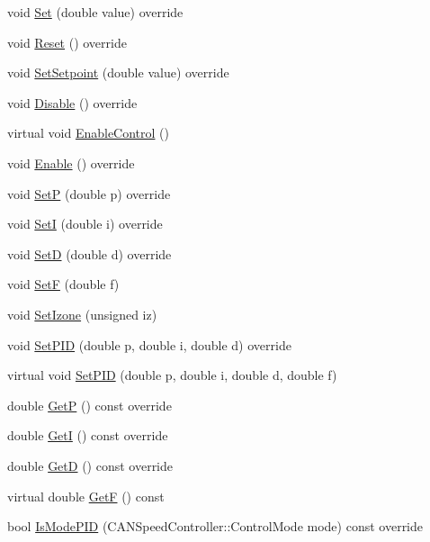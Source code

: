 \begin{DoxyCompactItemize}
\item 
void \hyperlink{class_c_a_n_talon_a4562f7fb454693a0b19e6eba955a0c71}{Set} (double value) override
\item 
void \hyperlink{class_c_a_n_talon_acb83bdcca65d305472d1f7c23ae6d2ee}{Reset} () override
\item 
void \hyperlink{class_c_a_n_talon_abad2c78d5a46552d7e0eac171214083d}{Set\+Setpoint} (double value) override
\item 
void \hyperlink{class_c_a_n_talon_a8bd799926d0efa4e4cf99d0f64e94371}{Disable} () override
\item 
virtual void \hyperlink{class_c_a_n_talon_a174cae574f8c73a4d211d7484fddd7ef}{Enable\+Control} ()
\item 
void \hyperlink{class_c_a_n_talon_a564c64c730580b6f80cf6c5f9eb42032}{Enable} () override
\item 
void \hyperlink{class_c_a_n_talon_a6a8c44252d104634d6a0c580088cbf98}{SetP} (double p) override
\item 
void \hyperlink{class_c_a_n_talon_ac72349fb7837dff1a27c5288416eb1ac}{SetI} (double i) override
\item 
void \hyperlink{class_c_a_n_talon_ad1d9dc5cb06e4efbf57ed10d91f2ee80}{SetD} (double d) override
\item 
void \hyperlink{class_c_a_n_talon_ac147cdb9096848beac85a25d04489d60}{SetF} (double f)
\item 
void \hyperlink{class_c_a_n_talon_a232b637087900eac7272450015c2be04}{Set\+Izone} (unsigned iz)
\item 
void \hyperlink{class_c_a_n_talon_ae6454fc74fcdf5b8afa8da07d08f0290}{Set\+P\+ID} (double p, double i, double d) override
\item 
virtual void \hyperlink{class_c_a_n_talon_a416e51c661eb35c05b594fa19793eb09}{Set\+P\+ID} (double p, double i, double d, double f)
\item 
double \hyperlink{class_c_a_n_talon_a701df7e254b4e6731bff57e7ae19d330}{GetP} () const override
\item 
double \hyperlink{class_c_a_n_talon_a29c00b36b915c21c5ae10c3cf64ce244}{GetI} () const override
\item 
double \hyperlink{class_c_a_n_talon_aeae71b2de2e9c711f46a9a2e3ce08282}{GetD} () const override
\item 
virtual double \hyperlink{class_c_a_n_talon_a568bfe876c2915efde9662976107365e}{GetF} () const
\item 
bool \hyperlink{class_c_a_n_talon_a21e75c3f26191a40c3ed9daa4fc0eacd}{Is\+Mode\+P\+ID} (C\+A\+N\+Speed\+Controller\+::\+Control\+Mode mode) const override

\end{DoxyCompactItemize}
